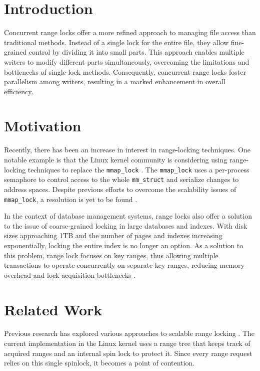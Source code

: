 \section{Introduction}

Concurrent range locks offer a more refined approach to managing file access than traditional methods. Instead of a single lock for the entire file, they allow fine-grained control by dividing it into small parts. This approach enables multiple writers to modify different parts simultaneously, overcoming the limitations and bottlenecks of single-lock methods. Consequently, concurrent range locks foster parallelism among writers, resulting in a marked enhancement in overall efficiency.

\section{Motivation}
Recently, there has been an increase in interest in range-locking techniques. One notable example is that the Linux kernel community is considering using range-locking techniques to replace the \texttt{mmap\_lock} \parencite{readerWriterLocks2017, mapleTree2021, mmapLock2022}. The \texttt{mmap\_lock} uses a per-process semaphore to control access to the whole \texttt{mm\_struct} \parencite{mmstruct2023} and serialize changes to address spaces.  Despite previous efforts to overcome the scalability issues of \texttt{mmap\_lock}, a resolution is yet to be found \parencite{mmapLock2022}.

In the context of database management systems, range locks also offer a solution to the issue of coarse-grained locking in large databases and indexes. With disk sizes approaching 1TB and the number of pages and indexes increasing exponentially, locking the entire index is no longer an option. As a solution to this problem, range lock focuses on key ranges, thus allowing multiple transactions to operate concurrently on separate key ranges, reducing memory overhead and lock acquisition bottlenecks \parencite{Graefe2020}.

\section{Related Work}
Previous research has explored various approaches to scalable range locking \parencite{linuxRangeLockImpl2013, migrationWM2023, scalableRangeLock2020}. The current implementation in the Linux kernel uses a range tree \parencite{linuxRangeLockImpl2013} that keeps track of acquired ranges and an internal spin lock to protect it. Since every range request relies on this single spinlock, it becomes a point of contention. 

